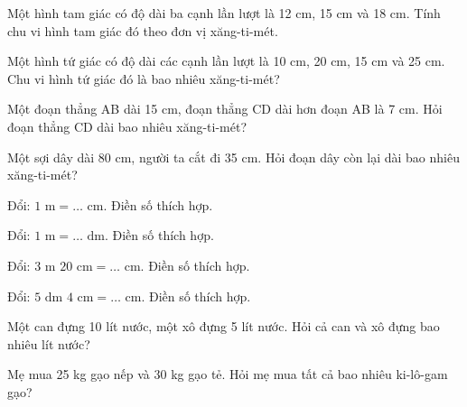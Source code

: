 \begin{ex}
Một hình tam giác có độ dài ba cạnh lần lượt là 12 cm, 15 cm và 18 cm. Tính chu vi hình tam giác đó theo đơn vị xăng-ti-mét.
\end{ex}

\begin{ex}
Một hình tứ giác có độ dài các cạnh lần lượt là 10 cm, 20 cm, 15 cm và 25 cm. Chu vi hình tứ giác đó là bao nhiêu xăng-ti-mét?
\end{ex}

\begin{ex}
Một đoạn thẳng AB dài 15 cm, đoạn thẳng CD dài hơn đoạn AB là 7 cm. Hỏi đoạn thẳng CD dài bao nhiêu xăng-ti-mét?
\end{ex}

\begin{ex}
Một sợi dây dài 80 cm, người ta cắt đi 35 cm. Hỏi đoạn dây còn lại dài bao nhiêu xăng-ti-mét?
\end{ex}

\begin{ex}
Đổi: $1\text{ m} = \dots\text{ cm}$. Điền số thích hợp.
\end{ex}

\begin{ex}
Đổi: $1\text{ m} = \dots\text{ dm}$. Điền số thích hợp.
\end{ex}

\begin{ex}
Đổi: $3\text{ m } 20\text{ cm} = \dots\text{ cm}$. Điền số thích hợp.
\end{ex}

\begin{ex}
Đổi: $5\text{ dm } 4\text{ cm} = \dots\text{ cm}$. Điền số thích hợp.
\end{ex}

\begin{ex}
Một can đựng 10 lít nước, một xô đựng 5 lít nước. Hỏi cả can và xô đựng bao nhiêu lít nước?
\end{ex}

\begin{ex}
Mẹ mua 25 kg gạo nếp và 30 kg gạo tẻ. Hỏi mẹ mua tất cả bao nhiêu ki-lô-gam gạo?
\end{ex}

